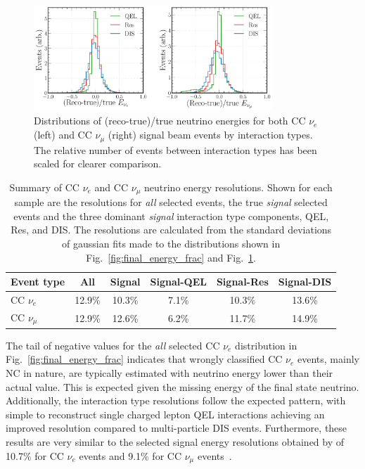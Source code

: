 \begin{figure} %
    \includegraphics[width=0.8\textwidth]{diagrams/7-results/final_energy_frac_split.pdf}
    \caption[Distributions of (reco-true)/true neutrino energies by interaction type]
    {Distributions of (reco-true)/true neutrino energies for both CC $\nu_{e}$ (left) and CC
        $\nu_{\mu}$ (right) signal beam events by interaction types. The relative number of events
        between interaction types has been scaled for clearer comparison.}
    \label{fig:final_energy_frac_split}
\end{figure}

\begin{table}
    \begin{tabular}{lccccc}
        Event type     & All    & Signal & Signal-QEL & Signal-Res & Signal-DIS \\
        \midrule
        CC $\nu_{e}$   & 12.9\% & 10.3\% & 7.1\%      & 10.3\%     & 13.6\%     \\
        CC $\nu_{\mu}$ & 12.9\% & 12.6\% & 6.2\%      & 11.7\%     & 14.9\%     \\
    \end{tabular}
    \caption[Summary of CC $\nu_{e}$ and CC $\nu_{\mu}$ neutrino energy resolutions]
    {Summary of CC $\nu_{e}$ and CC $\nu_{\mu}$ neutrino energy resolutions. Shown for each sample
        are the resolutions for \emph{all} selected events, the true \emph{signal} selected events
        and the three dominant \emph{signal} interaction type components, QEL, Res, and DIS. The
        resolutions are calculated from the standard deviations of gaussian fits made to the
        distributions shown in Fig.~\ref{fig:final_energy_frac} and
        Fig.~\ref{fig:final_energy_frac_split}.}
    \label{tab:energy_resolutions}
\end{table}

The tail of negative values for the \emph{all} selected CC $\nu_{e}$ distribution in
Fig.~\ref{fig:final_energy_frac} indicates that wrongly classified CC $\nu_{e}$ events, mainly NC
in nature, are typically estimated with neutrino energy lower than their actual value. This is
expected given the missing energy of the final state neutrino. Additionally, the interaction type
resolutions follow the expected pattern, with simple to reconstruct single charged lepton QEL
interactions achieving an improved resolution compared to multi-particle DIS events. Furthermore,
these results are very similar to the selected signal energy resolutions obtained by \nova of
10.7\% for CC $\nu_{e}$ events and 9.1\% for CC $\nu_{\mu}$ events~\cite{acero2019}.

